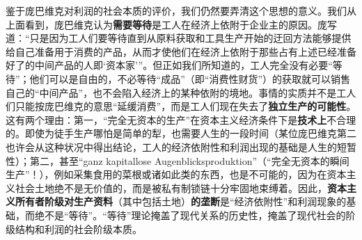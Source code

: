 \documentclass[fontset=fandol, a4paper, 12pt, openright]{ctexbook}
\begin{document}
鉴于庞巴维克对利润的社会本质的评价，我们仍然要弄清这个思想的意义。我们从上面看到，庞巴维克认为\textbf{需要等待}是工人在经济上依附于企业主的原因。庞写道：“只是因为工人们要等待直到从原料获取和工具生产开始的迂回方法能够提供给自己准备用于消费的产品，从而才使他们在经济上依附于那些占有上述已经准备好了的中间产品的人即‘资本家’”。但正如我们所知道的，工人完全没有必要“等待”；他们可以是自由的，不必等待“成品”（即“消费性财货”）的获取就可以销售自己的“中间产品”，也不会陷入经济上的某种依附的境地。事情的实质并不是工人们只能按庞巴维克的意思“延缓消费”，而是工人们现在失去了\textbf{独立生产的可能性}。这有两个理由：第一，“完全无资本的生产”在资本主义经济条件下是\textbf{技术上}不合理的。即使为徒手生产哪怕是简单的犁，也需要人生的一段时间（某位庞巴维克第二也许会从这种状况中得出结论，工人的经济依附性和利润出现的基础是人生的短暂性）；第二，甚至“ganz kapitallose Augenblicksproduktion”（“完全无资本的瞬间生产”！），例如采集食用的菜根或诸如此类的东西，也是不可能的，因为在资本主义社会土地绝不是无价值的，而是被私有制锁链十分牢固地束缚着。因此，\textbf{资本主义所有者阶级对生产资料}（其中包括土地）\textbf{的垄断}是“经济依附性”和利润现象的基础，而绝不是“等待”。“等待”理论掩盖了现代关系的历史性，掩盖了现代社会的阶级结构和利润的社会阶级本质。
\end{document}

